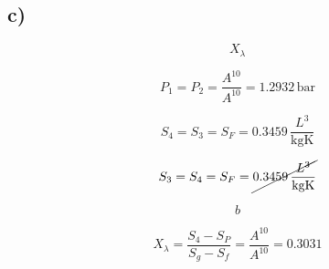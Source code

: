 

\subsection*{c)}

\[
X_\lambda
\]

\[
P_1 = P_2 = \frac{A^{10}}{A^{10}} = 1.2932 \, \text{bar}
\]

\[
S_4 = S_3 = S_F = 0.3459 \, \frac{L^3}{\text{kgK}}
\]

\[
S_3 = S_4 = S_F = \cancel{0.3459 \, \frac{L^3}{\text{kgK}}}
\]

\[
b
\]

\[
X_\lambda = \frac{S_4 - S_P}{S_g - S_f} = \frac{A^{10}}{A^{10}} = 0.3031
\]